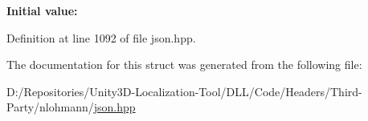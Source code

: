 {\bfseries Initial value\+:}
\begin{DoxyCode}{0}
\DoxyCodeLine{=}

\end{DoxyCode}


Definition at line 1092 of file json.\+hpp.



The documentation for this struct was generated from the following file\+:\begin{DoxyCompactItemize}
\item 
D\+:/\+Repositories/\+Unity3\+D-\/\+Localization-\/\+Tool/\+D\+L\+L/\+Code/\+Headers/\+Third-\/\+Party/nlohmann/\mbox{\hyperlink{json_8hpp}{json.\+hpp}}\end{DoxyCompactItemize}
